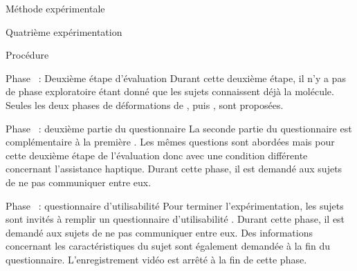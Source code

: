 \documentclass[myfrancais]{mythesis}
\begin{document}
\begin{mychapter}{Méthode expérimentale}
\begin{mysection}{Quatrième expérimentation}
\begin{mysubsection}{Procédure}
\begin{myparagraph}{Phase~ : Deuxième étape d'évaluation}
					Durant cette deuxième étape, il n'y a pas de phase exploratoire étant donné que les sujets connaissent déjà la molécule.
					Seules les deux phases de déformations de , \myUbiquitin puis \myNusENusG, sont proposées.
				\end{myparagraph}
				\begin{myparagraph}{Phase~ : deuxième partie du questionnaire}
					La seconde partie du questionnaire est complémentaire à la première .
					Les mêmes questions sont abordées mais pour cette deuxième étape de l'évaluation donc avec une condition différente concernant l'assistance haptique.
					Durant cette phase, il est demandé aux sujets de ne pas communiquer entre eux.
				\end{myparagraph}
				\begin{myparagraph}{Phase~ : questionnaire d'utilisabilité}
					Pour terminer l'expérimentation, les sujets sont invités à remplir un questionnaire d'utilisabilité .
					Durant cette phase, il est demandé aux sujets de ne pas communiquer entre eux.
					Des informations concernant les caractéristiques du sujet sont également demandée à la fin du questionnaire.
					L'enregistrement vidéo est arrêté à la fin de cette phase.
				\end{myparagraph}
			\end{mysubsection}
		\end{mysection}
	\end{mychapter}
\end{document}
